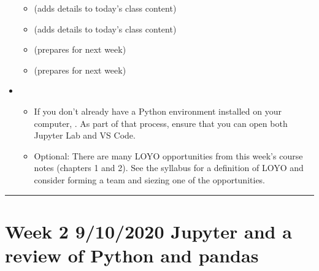 \documentclass[letterpaper,10pt,english]{sphinxmanual}
\begin{document}
\begin{itemize}
\begin{itemize}
\item {} 
{\hyperref[\detokenize{chapter-1-intro-to-data-science::doc}]{}} (adds details to today’s class content)

\item {} 
{\hyperref[\detokenize{chapter-2-mathematical-foundations::doc}]{}} (adds details to today’s class content)

\item {} 
{\hyperref[\detokenize{chapter-3-jupyter::doc}]{}} (prepares for next week)

\item {} 
{\hyperref[\detokenize{chapter-4-review-of-python-and-pandas::doc}]{}} (prepares for next week)

\end{itemize}

\item {} 
\begin{itemize}
\item {} 
If you don’t already have a Python environment installed on your computer, {\hyperref[\detokenize{anaconda-installation::doc}]{}}.  As part of that process, ensure that you can open both Jupyter Lab and VS Code.

\item {} 
Optional: There are many LOYO opportunities from this week’s course notes (chapters 1 and 2).  See the syllabus for a definition of LOYO and consider forming a team and siezing one of the opportunities.

\end{itemize}

\end{itemize}


\bigskip\hrule\bigskip



\section{Week 2 \sphinxhyphen{} 9/10/2020 \sphinxhyphen{} Jupyter and a review of Python and pandas}
\label{\detokenize{course-schedule:week-2-9-10-2020-jupyter-and-a-review-of-python-and-pandas}}
\end{document}
